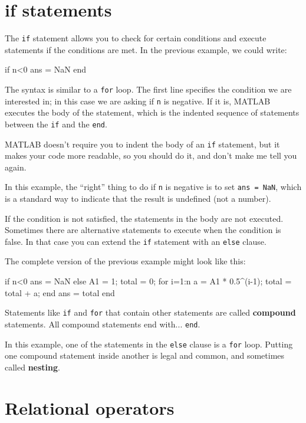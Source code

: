 \documentclass[
]{book}
\numberwithin{Answer}{chapter}
\numberwithin{Exercise}{chapter}
\begin{document}
\section{if statements}


The {\tt if} statement allows you to check for certain conditions
and execute statements if the conditions are met.  In the previous
example, we could write:

\begin{code}
if n<0
    ans = NaN
end
\end{code}

The syntax is similar to a {\tt for} loop.  The first line
specifies the condition we are interested in; in this case we
are asking if {\tt n} is negative.  If it is, MATLAB executes
the body of the statement, which is the indented sequence of
statements between the {\tt if} and the {\tt end}.

MATLAB doesn't require you to indent the body of an {\tt if}
statement, but it makes your code more readable, so you should do it,
and don't make me tell you again.

In this example, the ``right'' thing to do if {\tt n} is negative
is to set {\tt ans = NaN}, which is a standard way to indicate that
the result is undefined (not a number).

If the condition is not satisfied, the statements in the body are
not executed.  Sometimes there are alternative statements to
execute when the condition is false.  In that case you can extend
the {\tt if} statement with an {\tt else} clause.

The complete version of the previous example might look like this:

\begin{code}
if n<0
    ans = NaN
else
    A1 = 1;
    total = 0;
    for i=1:n
        a = A1 * 0.5^(i-1);
        total = total + a;
    end
    ans = total
end
\end{code}

Statements like {\tt if} and {\tt for} that contain other statements
are called {\bf compound} statements.  All compound statements end
with... {\tt end}.

In this example, one of the statements in the {\tt else} clause is a
{\tt for} loop.  Putting one compound statement inside another is
legal and common, and sometimes called {\bf nesting}.


\section{Relational operators}
\end{document}
